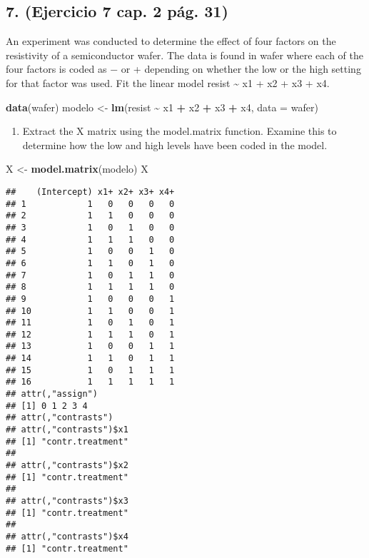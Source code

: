 \documentclass[
]{article}
\newenvironment{Shaded}{\begin{snugshade}}{\end{snugshade}}
\newcommand{\AttributeTok}[1]{\textcolor[rgb]{0.13,0.29,0.53}{#1}}
\newcommand{\FunctionTok}[1]{\textcolor[rgb]{0.13,0.29,0.53}{\textbf{#1}}}
\newcommand{\NormalTok}[1]{#1}
\newcommand{\OtherTok}[1]{\textcolor[rgb]{0.56,0.35,0.01}{#1}}
\newcommand{\SpecialCharTok}[1]{\textcolor[rgb]{0.81,0.36,0.00}{\textbf{#1}}}
\providecommand{\tightlist}{%
  \setlength{\itemsep}{0pt}\setlength{\parskip}{0pt}}
\begin{document}
\hypertarget{ejercicio-7-cap.-2-puxe1g.-31}{%
\subsection{7. (Ejercicio 7 cap. 2 pág.
31)}\label{ejercicio-7-cap.-2-puxe1g.-31}}

An experiment was conducted to determine the effect of four factors on
the resistivity of a semiconductor wafer. The data is found in wafer
where each of the four factors is coded as − or + depending on whether
the low or the high setting for that factor was used. Fit the linear
model resist \textasciitilde{} x1 + x2 + x3 + x4.

\begin{Shaded}
\begin{Highlighting}[]
\FunctionTok{data}\NormalTok{(wafer)}
\NormalTok{modelo }\OtherTok{\textless{}{-}} \FunctionTok{lm}\NormalTok{(resist }\SpecialCharTok{\textasciitilde{}}\NormalTok{ x1 }\SpecialCharTok{+}\NormalTok{ x2 }\SpecialCharTok{+}\NormalTok{ x3 }\SpecialCharTok{+}\NormalTok{ x4, }\AttributeTok{data =}\NormalTok{ wafer)}
\end{Highlighting}
\end{Shaded}

\begin{enumerate}
\def\labelenumi{(\alph{enumi})}
\tightlist
\item
  Extract the X matrix using the model.matrix function. Examine this to
  determine how the low and high levels have been coded in the model.
\end{enumerate}

\begin{Shaded}
\begin{Highlighting}[]
\NormalTok{X }\OtherTok{\textless{}{-}} \FunctionTok{model.matrix}\NormalTok{(modelo)}
\NormalTok{X}
\end{Highlighting}
\end{Shaded}

\begin{verbatim}
##    (Intercept) x1+ x2+ x3+ x4+
## 1            1   0   0   0   0
## 2            1   1   0   0   0
## 3            1   0   1   0   0
## 4            1   1   1   0   0
## 5            1   0   0   1   0
## 6            1   1   0   1   0
## 7            1   0   1   1   0
## 8            1   1   1   1   0
## 9            1   0   0   0   1
## 10           1   1   0   0   1
## 11           1   0   1   0   1
## 12           1   1   1   0   1
## 13           1   0   0   1   1
## 14           1   1   0   1   1
## 15           1   0   1   1   1
## 16           1   1   1   1   1
## attr(,"assign")
## [1] 0 1 2 3 4
## attr(,"contrasts")
## attr(,"contrasts")$x1
## [1] "contr.treatment"
## 
## attr(,"contrasts")$x2
## [1] "contr.treatment"
## 
## attr(,"contrasts")$x3
## [1] "contr.treatment"
## 
## attr(,"contrasts")$x4
## [1] "contr.treatment"
\end{verbatim}
\end{document}
